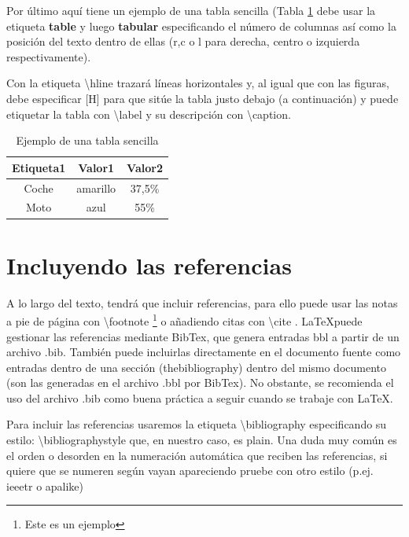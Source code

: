 
Por último aquí tiene un ejemplo de una tabla sencilla (Tabla \ref{tab:tablasencilla} debe usar la etiqueta \textbf{table} y luego \textbf{tabular} especificando el número de columnas así como la posición del texto dentro de ellas (r,c o l para derecha, centro o izquierda respectivamente).

Con la etiqueta \textbackslash hline trazará líneas horizontales y, al igual que con las figuras, debe especificar [H] para que sitúe la tabla justo debajo (a continuación) y puede etiquetar la tabla con \textbackslash label y su descripción con \textbackslash caption.

\begin{table}[H]
\centering
\begin{tabular}{|c|c|c|}
\hline
\textbf{ Etiqueta1} & \textbf{Valor1} & \textbf{Valor2} \\
\hline
Coche & amarillo & 37,5\% \\
Moto & azul & 55\% \\
\hline
\end{tabular}  
\caption{Ejemplo de una tabla sencilla} \label{tab:tablasencilla}
\end{table}



\section{Incluyendo las referencias}

A lo largo del texto, tendrá que incluir referencias, para ello puede usar las notas a pie de página con \textbackslash footnote \footnote{Este es un ejemplo} o añadiendo citas con \textbackslash cite \cite{mrx05,prueba2}. \LaTeX puede gestionar las referencias mediante BibTex, que genera entradas bbl a partir de un archivo .bib. También puede incluirlas directamente en el documento fuente como entradas dentro de una sección (thebibliography) dentro del mismo documento (son las generadas en el archivo .bbl por BibTex). No obstante, se recomienda el uso del archivo .bib como buena práctica a seguir cuando se trabaje con \LaTeX.

Para incluir las referencias usaremos la etiqueta \textbackslash bibliography especificando su estilo: \textbackslash bibliographystyle que, en nuestro caso, es plain. Una duda muy común es el orden o desorden en la numeración automática que reciben las referencias, si quiere que se numeren según vayan apareciendo pruebe con otro estilo (p.ej. ieeetr o apalike)

